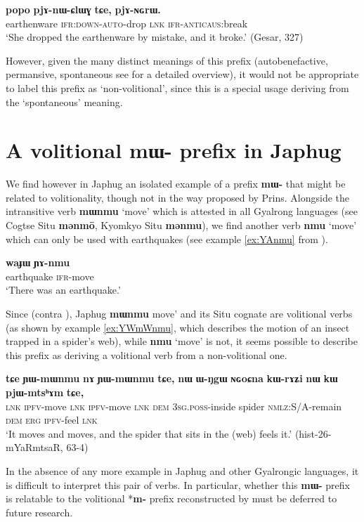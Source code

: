 \documentclass[oneside,a4paper,11pt]{article}
\newcommand{\ipa}[1]{\textbf{{\phon\mbox{#1}}}} %
\begin{document}
\begin{exe}
\ex \label{ex:pjAnWClWG}
\gll \ipa{popo} 	\ipa{pjɤ-nɯ-ɕlɯɣ} 	\ipa{tɕe,} 	\ipa{pjɤ-ɴɢrɯ.}  \\
earthenware \textsc{ifr:down-auto}-drop \textsc{lnk} \textsc{ifr-anticaus}:break \\
\glt `She dropped the earthenware by mistake, and it broke.' (Gesar, 327)
\end{exe}

 However, given the many distinct meanings of this prefix (autobenefactive,  permansive, spontaneous see \citet{jacques16japhug} for a detailed overview), it would not be appropriate to label this prefix as `non-volitional', since this is a special usage deriving from the `spontaneous' meaning.

\section{A volitional \ipa{mɯ-} prefix in Japhug}
We find however in Japhug an isolated example of a prefix \ipa{mɯ-} that might be related to volitionality, though not in the way proposed by Prins. Alongside the intransitive verb \ipa{mɯnmu} `move' which is attested in all Gyalrong languages (see Cogtse Situ \ipa{mənmō}, Kyomkyo Situ \ipa{mənmu}), we find another verb \ipa{nmu} `move' which can only be used with earthquakes (see example \ref{ex:YAnmu} from \citealt{jacques16japhug}).

\begin{exe}
\ex \label{ex:YAnmu}
\gll
\ipa{waɟɯ} \ipa{ɲɤ-nmu} \\
earthquake \textsc{ifr}-move \\
\glt `There was an earthquake.'
\end{exe}

Since (contra \citealt[505]{prins16kyomkyo}), Japhug \ipa{mɯnmu}  move' and its Situ cognate are  volitional verbs (as shown by example  \ref{ex:YWmWnmu}, which describes the motion of an insect trapped in a spider's web), while \ipa{nmu} `move' is not, it seems possible to describe this prefix as deriving a volitional verb from a non-volitional one.

\begin{exe}
\ex \label{ex:YWmWnmu}
\gll
\ipa{tɕe}	\ipa{ɲɯ-mɯnmu}	\ipa{nɤ}	\ipa{ɲɯ-mɯnmu}	\ipa{tɕe,}	\ipa{nɯ}	\ipa{ɯ-ŋgɯ}	\ipa{ɴɢoɕna}	\ipa{kɯ-rɤʑi}	\ipa{nɯ}	\ipa{kɯ}	\ipa{pjɯ-mtsʰɤm}	\ipa{tɕe,} \\
\textsc{lnk} \textsc{ipfv}-move \textsc{lnk}  \textsc{ipfv}-move \textsc{lnk} \textsc{dem} \textsc{3sg.poss}-inside spider \textsc{nmlz}:S/A-remain \textsc{dem} \textsc{erg} \textsc{ipfv}-feel \textsc{lnk} \\
\glt `It moves and moves, and the spider that sits in the (web) feels it.' (hist-26-mYaRmtsaR, 63-4)
\end{exe}

In the absence of any more example in Japhug and other Gyalrongic languages, it is difficult to interpret this pair of verbs. In particular, whether this \ipa{mɯ-} prefix is relatable to the volitional *\ipa{m-} prefix reconstructed by \citet[55]{bs14oc} must be deferred to future research.



\end{document}
